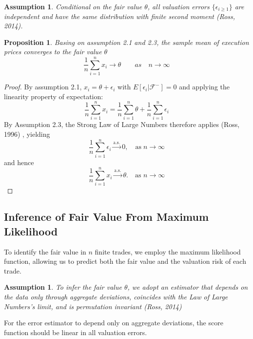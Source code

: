 \documentclass[12pt]{article}
\theoremstyle{plain}
\newtheorem{proposition}[theorem]{Proposition}
\newtheorem{assumption}[theorem]{Assumption}
\theoremstyle{definition}
\numberwithin{equation}{section}
\begin{document}
\begin{assumption}
Conditional on the fair value $\theta$, all valuation errors $\{\epsilon_{i \geq 1}\}$ are independent and have the same distribution with finite second moment (Ross, 2014).
\end{assumption}

\begin{proposition}
Basing on assumption 2.1 and 2.3, the sample mean of execution prices converges to the fair value $\theta$
\begin{equation}
\frac{1}{n} \sum^{n}_{i =1}x_i \rightarrow \theta \qquad as \quad n\rightarrow \infty
\end{equation}
\end{proposition}

\begin{proof}
By assumption 2.1, $x_i = \theta + \epsilon_i$ with $E[\epsilon_i | \mathcal{F}^-] = 0$ and applying the linearity property of expectation:\\
\begin{equation}
\frac{1}{n} \sum^{n}_{i =1} x_i = \frac{1}{n} \sum^{n}_{i =1} \theta + \frac{1}{n} \sum^{n}_{i =1} \epsilon_i
\end{equation}
By Assumption 2.3, the Strong Law of Large Numbers therefore applies (Ross, 1996) , yielding
\begin{equation}
\frac{1}{n}\sum_{i=1}^n \epsilon_i \xrightarrow{\text{a.s.}} 0, \quad \text{as} \;  n \rightarrow \infty
\end{equation}
and hence
\begin{equation}
\frac{1}{n}\sum_{i=1}^n x_i \xrightarrow{\text{a.s.}} \theta. \quad \text{as $n\rightarrow \infty$}
\end{equation}
\end{proof}

\subsection{Inference of Fair Value From Maximum Likelihood}
To identify the fair value in $n$ finite trades, we employ the maximum likelihood function, allowing us to predict both the fair value and the valuation risk of each trade.

\begin{assumption}
To infer the fair value $\theta$, we adopt an estimator that depends on the data only through aggregate deviations, coincides with the Law of Large Numbers's limit, and is permutation invariant (Ross, 2014)
\end{assumption}
For the error estimator to depend only on aggregate deviations, the score function should be linear in all valuation errors.\\
\end{document}
